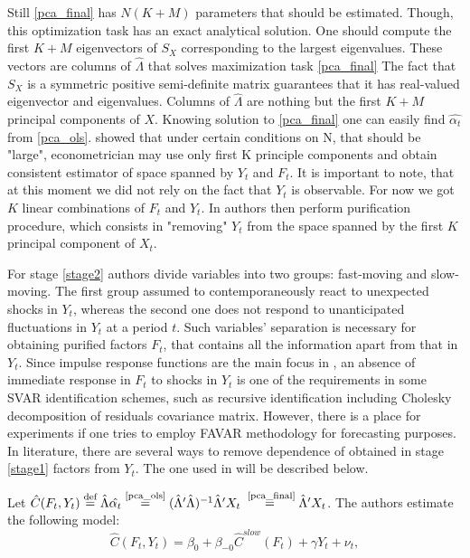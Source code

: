 \documentclass[a4paper, 14pt]{article}
\begin{document}
 Still \eqref{pca_final} has $N(K+M)$ parameters that should be estimated. Though, this optimization task has an exact analytical solution. One should compute the first $K+M$ eigenvectors of $S_X$ corresponding to the largest eigenvalues. These vectors are columns of $\hat{\Lambda}$ that solves maximization task \eqref{pca_final} The fact that $S_X$ is a symmetric positive semi-definite matrix guarantees that it has real-valued eigenvector and eigenvalues. Columns of $\hat{\Lambda}$ are nothing but the first $K+M$ principal components of $X$. Knowing solution to \eqref{pca_final} one can easily find $\hat{\alpha_t}$ from \eqref{pca_ols}. \cite{stock2002macroeconomic} showed that under certain conditions on N, that should be "large", econometrician may use only first K principle components and obtain consistent estimator of space spanned by $Y_t$ and $F_t$. It is important to note, that at this moment we did not rely on the fact that $Y_t$ is observable. For now we got $K$ linear combinations of $F_t$ and $Y_t$. In \cite{bernanke2005measuring} authors then perform purification procedure, which consists in "removing" $Y_t$ from the space spanned by the first $K$ principal component of $X_t$.
 
 For stage \ref{stage2} authors divide variables into two groups: fast-moving and slow-moving. The first group assumed to contemporaneously react to unexpected shocks in $Y_t$, whereas the second one does not respond to unanticipated fluctuations in $Y_t$ at a period $t$. Such variables' separation is necessary for obtaining purified factors $F_t$, that contains all the information apart from that in $Y_t$. Since impulse response functions are the main focus in \cite{bernanke2005measuring}, an absence of immediate response in $F_t$ to shocks in $Y_t$ is one of the requirements in some SVAR identification schemes, such as recursive identification including Cholesky decomposition of residuals covariance matrix. However, there is a place for experiments if one tries to employ FAVAR methodology for forecasting purposes. In literature, there are several ways to remove dependence of obtained in stage \ref{stage1} factors from $Y_t$. The one used in \cite{bernanke2005measuring} will be described below.
 
 \noindent Let $\hat{C}(F_t, Y_t) \stackrel{\text{def}}{=} \hat{\Lambda} \hat{\alpha_t} \stackrel{\text{\eqref{pca_ols}}}{=} (\hat\Lambda' \hat\Lambda)^{-1}\hat\Lambda'X_t  \stackrel{\text{ \eqref{pca_final}}}{=} \hat\Lambda'X_t$. The authors estimate the following model:
 \begin{equation}\label{favar_pure}
 \hat{C}(F_t, Y_t) = \beta_0 + \beta_{-0} \hat{C}^{slow}(F_t) + \gamma Y_t + \nu_t ,
 \end{equation}
 
\end{document}

